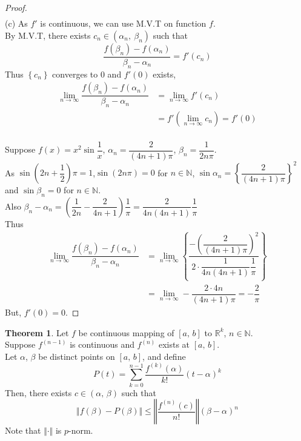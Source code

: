 \documentclass[12pt]{book}
\theoremstyle{definition}
\newtheorem{theorem}{Theorem}
\newcommand{\N}{\mathbb{N}}
\newcommand{\R}{\mathbb{R}}
\begin{document}
\begin{proof}
\begin{align*}
			\end{align*}
			\newpage
			\noindent(c) As $f'$ is continuous, we can use M.V.T on function $f$.\\
			By M.V.T, there exists $c_n\in(\alpha_n,~\beta_n)$ such that 
			\begin{equation*}
				\dfrac{f(\beta_n)-f(\alpha_n)}{\beta_n-\alpha_n}=f'(c_n)
			\end{equation*}
			Thus $\left\{c_n\right\}$ converges to $0$ and $f'(0)$ exists,
			\begin{align*}
				\displaystyle\lim_{n\rightarrow\infty} \dfrac{f(\beta_n)-f(\alpha_n)}{\beta_n-\alpha_n}&=\displaystyle\lim_{n\rightarrow\infty}f'(c_n)\\
				&=f'\left(\displaystyle\lim_{n\rightarrow\infty}c_n\right)=f'(0)
			\end{align*}
			\dotfill\\[2pt]
			Suppose $f(x)=x^2 \sin \dfrac{1}{x}$, $\alpha_n=\dfrac{2}{(4n+1)\pi}$, $\beta_n=\dfrac{1}{2n\pi}$.\\
			As $\sin\left(2n+\dfrac{1}{2}\right)\pi=1$,$\sin(2n\pi)=0$ for $n\in\N$, $\sin \alpha_n=\left\{\dfrac{2}{(4n+1)\pi}\right\}^2$ and $\sin \beta_n=0$ for $n\in\N$.\\
			Also $\beta_n-\alpha_n=\left(\dfrac{1}{2n}-\dfrac{2}{4n+1}\right)\dfrac{1}{\pi}=\dfrac{2}{4n(4n+1)}\dfrac{1}{\pi}$\\
			Thus
			\begin{align*}
				\displaystyle\lim_{n\rightarrow\infty}\dfrac{f(\beta_n)-f(\alpha_n)}{\beta_n-\alpha_n}&=\displaystyle\lim_{n\rightarrow\infty}\left\{\dfrac{-\left(\dfrac{2}{(4n+1)\pi}\right)^2}{2\cdot\dfrac{1}{4n(4n+1)}\dfrac{1}{\pi}}\right\}\\
				&=\displaystyle\lim_{n\rightarrow\infty}-\dfrac{2\cdot 4n}{(4n+1)\pi}=-\dfrac{2}{\pi}
			\end{align*}
			But, $f'(0)=0$.
		\end{proof}
		\newpage
		\begin{theorem}
			Let $f$ be continuous mapping of $[a,\,b]$ to $\R^k$, $n\in\N$.\\
			Suppose $f^{(n-1)}$ is continuous and $f^{(n)}$ exists at $[a,\,b]$.\\
			Let $\alpha$, $\beta$ be distinct points on $[a,\,b]$, and define
			$$P(t)=\displaystyle\sum_{k=0}^{n-1} \dfrac{f^{(k)}(\alpha)}{k!}(t-\alpha)^k$$
			Then, there exists $c\in(\alpha,\,\beta)$ such that $$\Vert f(\beta)-P(\beta)\Vert\leq \left\Vert \dfrac{f^{(n)}(c)}{n!}\right\Vert(\beta-\alpha)^n$$
			Note that $ \Vert\cdot\Vert $ is $p$-norm.
		\end{theorem}
\end{document}
